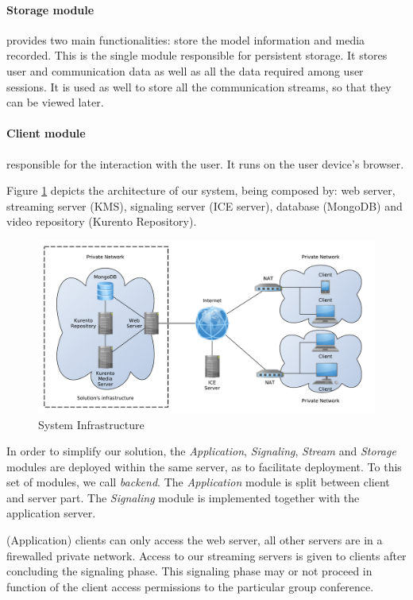 \documentclass[10pt,conference]{IEEEtran}
\begin{document}
\paragraph{Storage module} provides two main functionalities: store the model information and media recorded. This is the single module responsible for persistent storage. It stores user and communication data as well as all the data required among user sessions. It is used as well to store all the communication streams, so that they can be viewed later.

\paragraph{Client module} responsible for the interaction with the user. It runs on the user device's browser.


Figure \ref{fig:infrastructure} depicts the architecture of our system, being composed by: web server, streaming server (\gls{KMS}), signaling server (\gls{ICE} server), database (MongoDB) and video repository (Kurento Repository).

\begin{figure}
	\centering
	\includegraphics[width=\linewidth]{figures/infrastructure.pdf}
	\caption{System Infrastructure}
        \label{fig:infrastructure}
\end{figure}

In order to simplify our solution, the \emph{Application}, \emph{Signaling}, \emph{Stream} and \emph{Storage} modules are deployed within the same server, as to facilitate deployment.
To this set of modules, we call \emph{backend}.
The \emph{Application} module is split between client and server part.
The \emph{Signaling} module is implemented together with the application server.

(Application) clients can only access the web server, all other servers are in a firewalled private network.
Access to our streaming servers is given to clients after concluding the signaling phase.
This signaling phase may or not proceed in function of the client access permissions to the particular group conference.
\end{document}
